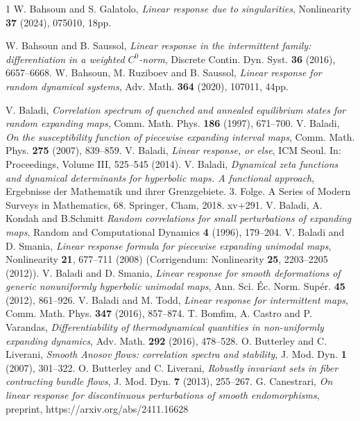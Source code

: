 \documentclass[11pt,reqno,a4paper]{article}
\theoremstyle{special}
\begin{document}
\begin{thebibliography}{1}
W. Bahsoun and S. Galatolo, \emph{Linear response due to singularities}, Nonlinearity \textbf{37} (2024), 075010, 18pp.


 W. Bahsoun and B. Saussol, \emph{Linear response in the intermittent family: differentiation in a weighted $C^0$-norm}, Discrete Contin. Dyn. Syst. \textbf{36} (2016),  6657--6668.
 W. Bahsoun, M. Ruziboev and B. Saussol, \emph{Linear response for random dynamical systems}, Adv. Math. \textbf{364} (2020), 107011, 44pp.

 V. Baladi, \emph{Correlation spectrum of quenched and annealed equilibrium states for random expanding maps}, Comm. Math. Phys.  \textbf{186} (1997), 671--700.
		 V. Baladi, \emph{On the susceptibility function of piecewise expanding interval maps}, Comm. Math. Phys. \textbf{275} (2007),  839--859.
		 V. Baladi, \emph{Linear response, or else}, ICM Seoul. In: Proceedings, Volume III, 525--545 (2014).
		 V. Baladi, \emph{Dynamical zeta functions and dynamical determinants for hyperbolic maps. A functional approach}, Ergebnisse der Mathematik und ihrer Grenzgebiete. 3. Folge. A Series of Modern Surveys in Mathematics, 68. Springer, Cham, 2018. xv+291.
		 V. Baladi, A. Kondah and B.Schmitt \emph{Random correlations for small perturbations of expanding maps}, Random and Computational Dynamics \textbf{4} (1996), 179--204.
		 V. Baladi and D. Smania, \emph{Linear response formula for piecewise expanding unimodal maps}, Nonlinearity \textbf{21}, 677–711 (2008) (Corrigendum: Nonlinearity \textbf{25}, 2203--2205 (2012)).
		 V. Baladi and D. Smania, \emph{Linear response for smooth deformations of generic nonuniformly hyperbolic unimodal maps},
		Ann. Sci. Éc. Norm. Supér.  \textbf{45} (2012), 861--926.
		 V. Baladi and M. Todd, \emph{Linear response for intermittent maps}, Comm. Math. Phys. \textbf{347} (2016),  857--874.
 T. Bomfim, A. Castro and P. Varandas, \emph{Differentiability of thermodynamical quantities in non-uniformly expanding dynamics}, Adv. Math. \textbf{292} (2016), 478--528.
		 O. Butterley and C. Liverani, \emph{Smooth Anosov flows: correlation spectra and stability}, J. Mod. Dyn. \textbf{1} (2007), 301--322.
		 O. Butterley and C. Liverani, \emph{Robustly invariant sets in fiber contracting bundle flows}, J. Mod. Dyn. \textbf{7} (2013), 255--267.
G. Canestrari, \emph{On linear response for discontinuous perturbations of smooth endomorphisms}, preprint, https://arxiv.org/abs/2411.16628
  

\end{thebibliography}
\end{document}
